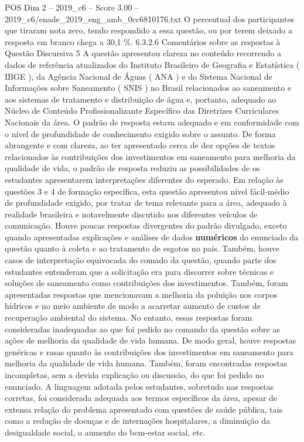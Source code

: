 \begin{textsample}{POS Dim 2 – 2019\_c6 – Score 3.00 – 2019\_c6/enade\_2019\_eng\_amb\_0cc6810176.txt}
O percentual dos participantes que tiraram nota zero, tendo respondido a essa questão, ou por terem deixado a resposta em branco chega a 30,1 \%. 6.3.2.6 Comentários sobre as respostas à Questão Discursiva 5 A questão apresentou clareza no conteúdo recorrendo a dados de referência atualizados do Instituto Brasileiro de Geografia e Estatística ( IBGE ), da Agência Nacional de Águas ( ANA ) e do Sistema Nacional de Informações sobre Saneamento ( SNIS ) no Brasil relacionados ao saneamento e aos sistemas de tratamento e distribuição de água e, portanto, adequado ao Núcleo de Conteúdo Profissionalizante Específico das Diretrizes Curriculares Nacionais da área.
O padrão de resposta estava adequado e em conformidade com o nível de profundidade de conhecimento exigido sobre o assunto.
De forma abrangente e com clareza, ao ter apresentado cerca de dez opções de textos relacionados às contribuições dos investimentos em saneamento para melhoria da qualidade de vida, o padrão de resposta reduziu as possibilidades de os estudantes apresentarem interpretações diferentes do esperado.
Em relação às questões 3 e 4 de formação específica, esta questão apresentou nível fácil-médio de profundidade exigido, por tratar de tema relevante para a área, adequado à realidade brasileira e notavelmente discutido nos diferentes veículos de comunicação.
Houve poucas respostas divergentes do padrão divulgado, exceto quando apresentadas explicações e análises de dados \textbf{numéricos} do enunciado da questão quanto à coleta e ao tratamento de esgotos no país.
Também, houve casos de interpretação equivocada do comado da questão, quando parte dos estudantes entenderam que a solicitação era para discorrer sobre técnicas e soluções de saneamento como contribuições dos investimentos.
Também, foram apresentadas respostas que mencionavam a melhoria da poluição nos corpos hídricos e no meio ambiente de modo a acarretar aumento de custos de recuperação ambiental do sistema.
No entanto, essas respostas foram consideradas inadequadas ao que foi pedido no comando da questão sobre as ações de melhoria da qualidade de vida humana.
De modo geral, houve respostas genéricas e rasas quanto às contribuições dos investimentos em saneamento para melhoria da qualidade de vida humana.
Também, foram encontradas respostas incompletas, sem a devida explicação ou discussão, do que foi pedido no enunciado.
A linguagem adotada pelos estudantes, sobretudo nas respostas corretas, foi considerada adequada aos termos específicos da área, apesar de extensa relação do problema apresentado com questões de saúde pública, tais como a redução de doenças e de internações hospitalares, a diminuição da desigualdade social, o aumento do bem-estar social, etc.

\end{textsample}
